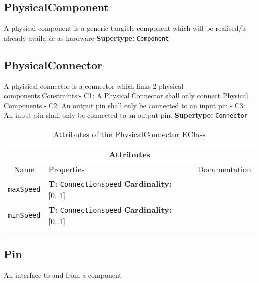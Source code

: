 \documentclass{article}
\begin{document}
\subsection[PhysicalComponent]{PhysicalComponent}
\label{e4smPhysicalComponent}

A physical component is a generic tangible component which will be realised/is already available as hardware
\textbf{Supertype: }\texttt{Component}
\subsection[PhysicalConnector]{PhysicalConnector}
\label{e4smPhysicalConnector}

A phyisical connector is a connector which links 2 physical components.Constraints:- C1: A Physical Connector shall only connect Physical Components.- C2: An output pin shall only be connected to an input pin.- C3: An input pin shall only be connected to an output pin.
\textbf{Supertype: }\texttt{Connector}
\begin{table}[H]
\footnotesize
\begin{tabularx}{\textwidth}{|c| p{4 cm} | X |}
\hline
\multicolumn{3}{|c|}{\textbf{Attributes}} \\
\hline
Name & Properties & Documentation \\ \hline \hline
\texttt{maxSpeed}
 & 
\textbf{T:} \texttt{Connectionspeed}
\newline
\textbf{Cardinality:} [0..1]
 & \\ \hline
\texttt{minSpeed}
 & 
\textbf{T:} \texttt{Connectionspeed}
\newline
\textbf{Cardinality:} [0..1]
 & \\ \hline
\caption{Attributes of the PhysicalConnector EClass}
\end{tabularx}
\label{e4smPhysicalConnectorattr}
\end{table}
\subsection[Pin]{Pin}
\label{e4smPin}

An interface to and from a component
\end{document}
